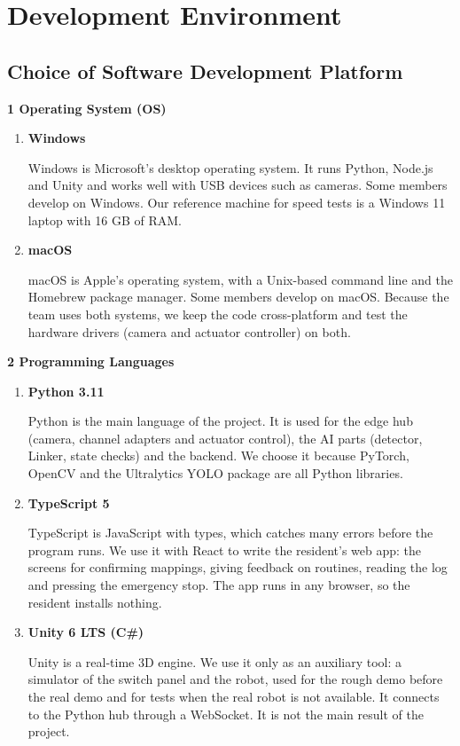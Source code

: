 \documentclass[conference]{IEEEtran}
\newcommand{\itemhead}[1]{\item \textbf{#1}\par\nobreak}
\begin{document}
\section{Development Environment}
\subsection{Choice of Software Development Platform}

\par\smallskip\noindent\textbf{1 Operating System (OS)}
\begin{enumerate}
\itemhead{Windows}
Windows is Microsoft's desktop operating system. It runs Python, Node.js and Unity and works well with USB devices such as cameras. Some members develop on Windows. Our reference machine for speed tests is a Windows 11 laptop with 16 GB of RAM.

\itemhead{macOS}
macOS is Apple's operating system, with a Unix-based command line and the Homebrew package manager. Some members develop on macOS. Because the team uses both systems, we keep the code cross-platform and test the hardware drivers (camera and actuator controller) on both.

\end{enumerate}

\par\smallskip\noindent\textbf{2 Programming Languages}
\begin{enumerate}
\itemhead{Python 3.11}
Python is the main language of the project. It is used for the edge hub (camera, channel adapters and actuator control), the AI parts (detector, Linker, state checks) and the backend. We choose it because PyTorch, OpenCV and the Ultralytics YOLO package are all Python libraries.

\itemhead{TypeScript 5}
TypeScript is JavaScript with types, which catches many errors before the program runs. We use it with React to write the resident's web app: the screens for confirming mappings, giving feedback on routines, reading the log and pressing the emergency stop. The app runs in any browser, so the resident installs nothing.

\itemhead{Unity 6 LTS (C\#)}
Unity is a real-time 3D engine. We use it only as an auxiliary tool: a simulator of the switch panel and the robot, used for the rough demo before the real demo and for tests when the real robot is not available. It connects to the Python hub through a WebSocket. It is not the main result of the project.

\end{enumerate}
\end{document}
